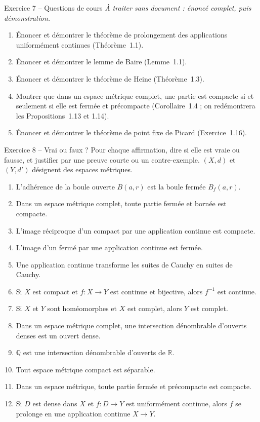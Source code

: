 \documentclass[11pt,a4paper]{article}
\newcommand{\R}{\mathbb{R}}
\newcommand{\Q}{\mathbb{Q}}
\newcommand{\Bf}{B_f}
\theoremstyle{definition}
\begin{document}
\begin{exo}{Exercice 7 -- Questions de cours}
\emph{À traiter sans document : énoncé complet, puis démonstration.}
\begin{enumerate}[label=(\alph*)]
  \item Énoncer et démontrer le théorème de prolongement des applications uniformément continues (Théorème~1.1).
  \item Énoncer et démontrer le lemme de Baire (Lemme~1.1).
  \item Énoncer et démontrer le théorème de Heine (Théorème~1.3).
  \item Montrer que dans un espace métrique complet, une partie est compacte si et seulement si elle est fermée et précompacte (Corollaire~1.4 ; on redémontrera les Propositions~1.13 et 1.14).
  \item Énoncer et démontrer le théorème de point fixe de Picard (Exercice~1.16).
\end{enumerate}
\end{exo}

\begin{exo}{Exercice 8 -- Vrai ou faux ?}
Pour chaque affirmation, dire si elle est vraie ou fausse, et justifier par une preuve courte ou un contre-exemple. $(X,d)$ et $(Y,d')$ désignent des espaces métriques.
\begin{enumerate}[label=\arabic*.]
  \item L'adhérence de la boule ouverte $B(a,r)$ est la boule fermée $\Bf(a,r)$.
  \item Dans un espace métrique complet, toute partie fermée et bornée est compacte.
  \item L'image réciproque d'un compact par une application continue est compacte.
  \item L'image d'un fermé par une application continue est fermée.
  \item Une application continue transforme les suites de Cauchy en suites de Cauchy.
  \item Si $X$ est compact et $f:X\to Y$ est continue et bijective, alors $f^{-1}$ est continue.
  \item Si $X$ et $Y$ sont homéomorphes et $X$ est complet, alors $Y$ est complet.
  \item Dans un espace métrique complet, une intersection dénombrable d'ouverts denses est un ouvert dense.
  \item $\Q$ est une intersection dénombrable d'ouverts de $\R$.
  \item Tout espace métrique compact est séparable.
  \item Dans un espace métrique, toute partie fermée et précompacte est compacte.
  \item Si $D$ est dense dans $X$ et $f:D\to Y$ est uniformément continue, alors $f$ se prolonge en une application continue $X\to Y$.
\end{enumerate}
\end{exo}
\end{document}

